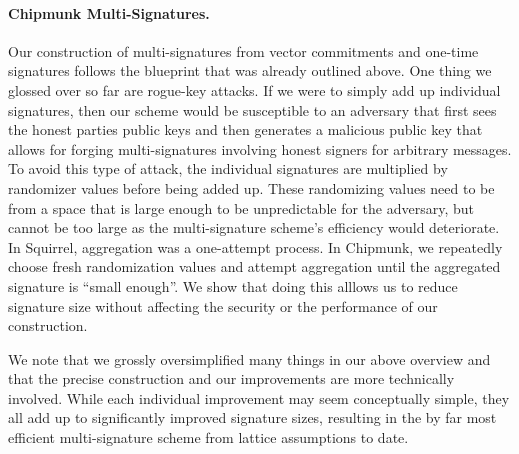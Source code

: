 \paragraph{Chipmunk Multi-Signatures.}
Our construction of multi-signatures from vector commitments and one-time signatures follows the blueprint that was already outlined above.
One thing we glossed over so far are rogue-key attacks.
If we were to simply add up individual signatures, then our scheme would be susceptible to an adversary that first sees the honest parties public keys and then generates a malicious public key that allows for forging multi-signatures involving honest signers for arbitrary messages.
To avoid this type of attack, the individual signatures are multiplied by randomizer values before being added up.
These randomizing values need to be from a space that is large enough to be unpredictable for the adversary, but cannot be too large as the multi-signature scheme's efficiency would deteriorate.
In Squirrel, aggregation was a one-attempt process.
In Chipmunk, we repeatedly choose fresh randomization values and attempt aggregation until the aggregated signature is ``small enough''.
We show that doing this alllows us to reduce signature size without affecting the security or the performance of our construction.

We note that we grossly oversimplified many things in our above overview and that the precise construction and our improvements are more technically involved.
While each individual improvement may seem conceptually simple, they all add up to significantly improved signature sizes, resulting in the by far most efficient multi-signature scheme from lattice assumptions to date.
